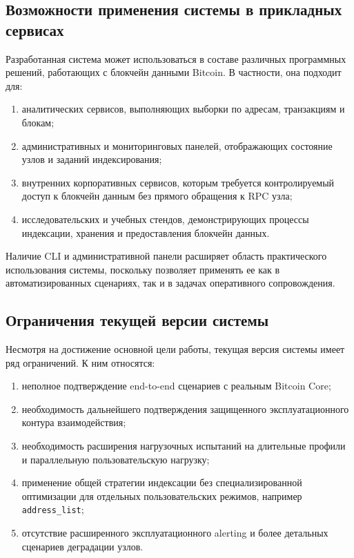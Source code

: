 \subsection{Возможности применения системы в прикладных сервисах}

Разработанная система может использоваться в составе различных программных
решений, работающих с блокчейн данными Bitcoin. В частности, она подходит для:
\begin{enumerate}
    \item аналитических сервисов, выполняющих выборки по адресам, транзакциям и блокам;
    \item административных и мониторинговых панелей, отображающих состояние узлов и заданий индексирования;
    \item внутренних корпоративных сервисов, которым требуется контролируемый
    доступ к блокчейн данным без прямого обращения к RPC узла;
    \item исследовательских и учебных стендов, демонстрирующих процессы
    индексации, хранения и предоставления блокчейн данных.
\end{enumerate}

Наличие CLI и административной панели расширяет область практического
использования системы, поскольку позволяет применять ее как в автоматизированных
сценариях, так и в задачах оперативного сопровождения.

\subsection{Ограничения текущей версии системы}

Несмотря на достижение основной цели работы, текущая версия системы
имеет ряд ограничений. К ним относятся:
\begin{enumerate}
    \item неполное подтверждение end-to-end сценариев с реальным Bitcoin Core;
    \item необходимость дальнейшего подтверждения защищенного эксплуатационного контура взаимодействия;
    \item необходимость расширения нагрузочных испытаний на длительные профили
    и параллельную пользовательскую нагрузку;
    \item применение общей стратегии индексации без специализированной
    оптимизации для отдельных пользовательских режимов, например \texttt{address\_list};
    \item отсутствие расширенного эксплуатационного alerting и более детальных
    сценариев деградации узлов.
\end{enumerate}

